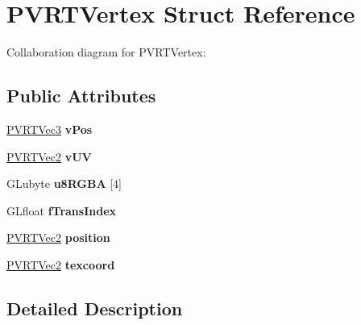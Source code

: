 \hypertarget{struct_p_v_r_t_vertex}{\section{P\+V\+R\+T\+Vertex Struct Reference}
\label{struct_p_v_r_t_vertex}
}


Collaboration diagram for P\+V\+R\+T\+Vertex\+:
\subsection*{Public Attributes}
\begin{DoxyCompactItemize}
\item 
\hypertarget{struct_p_v_r_t_vertex_a5cb0a745442a76111fc927cdb300291e}{\hyperlink{struct_p_v_r_t_vec3}{P\+V\+R\+T\+Vec3} {\bfseries v\+Pos}}\label{struct_p_v_r_t_vertex_a5cb0a745442a76111fc927cdb300291e}

\item 
\hypertarget{struct_p_v_r_t_vertex_afdbfe03d1aaace8d23f883d15e5b01f2}{\hyperlink{struct_p_v_r_t_vec2}{P\+V\+R\+T\+Vec2} {\bfseries v\+U\+V}}\label{struct_p_v_r_t_vertex_afdbfe03d1aaace8d23f883d15e5b01f2}

\item 
\hypertarget{struct_p_v_r_t_vertex_a210d5da6437ba0665d16d35117772238}{G\+Lubyte {\bfseries u8\+R\+G\+B\+A} \mbox{[}4\mbox{]}}\label{struct_p_v_r_t_vertex_a210d5da6437ba0665d16d35117772238}

\item 
\hypertarget{struct_p_v_r_t_vertex_a0e291d68a951b4cc6b59a498aef256e9}{G\+Lfloat {\bfseries f\+Trans\+Index}}\label{struct_p_v_r_t_vertex_a0e291d68a951b4cc6b59a498aef256e9}

\item 
\hypertarget{struct_p_v_r_t_vertex_a968798a117078544ba0f7bb889e1acdc}{\hyperlink{struct_p_v_r_t_vec2}{P\+V\+R\+T\+Vec2} {\bfseries position}}\label{struct_p_v_r_t_vertex_a968798a117078544ba0f7bb889e1acdc}

\item 
\hypertarget{struct_p_v_r_t_vertex_aa4140156fe2b04709f73f814d4c60781}{\hyperlink{struct_p_v_r_t_vec2}{P\+V\+R\+T\+Vec2} {\bfseries texcoord}}\label{struct_p_v_r_t_vertex_aa4140156fe2b04709f73f814d4c60781}

\end{DoxyCompactItemize}


\subsection{Detailed Description}


